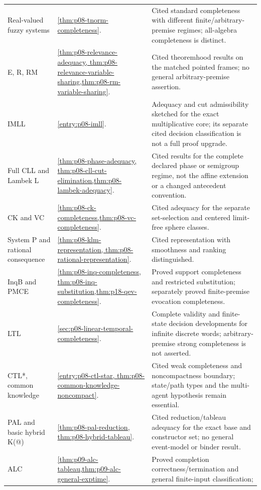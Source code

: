 \begin{longtable}{@{}p{}p{}p{}@{}}
Real-valued fuzzy systems & \cref{thm:p08-tnorm-completeness}. & Cited
standard completeness with different finite/arbitrary-premise regimes;
all-algebra completeness is distinct.\\\addlinespace
E, R, RM & \cref{thm:p08-relevance-adequacy,
thm:p08-relevance-variable-sharing,thm:p08-rm-variable-sharing}. & Cited
theoremhood results on the matched pointed frames; no general
arbitrary-premise assertion.\\\addlinespace
IMLL & \cref{entry:p08-imll}. & Adequacy and cut admissibility
sketched for the exact multiplicative core; its separate cited decision
classification is not a full proof upgrade.\\\addlinespace
Full CLL and Lambek L & \cref{thm:p08-phase-adequacy,
thm:p08-cll-cut-elimination,thm:p08-lambek-adequacy}. & Cited results for
the complete declared phase or semigroup regime, not the affine extension
or a changed antecedent convention.\\\addlinespace
CK and VC & \cref{thm:p08-ck-completeness,thm:p08-vc-completeness}. &
Cited adequacy for the separate set-selection and centered limit-free
sphere classes.\\\addlinespace
System P and rational consequence & \cref{thm:p08-klm-representation,
thm:p08-rational-representation}. & Cited representation with smoothness
and ranking distinguished.\\\addlinespace
InqB and PMCE & \cref{thm:p08-inq-completeness,
thm:p08-inq-substitution,thm:p18-qev-completeness}. & Proved support
completeness and restricted substitution; separately proved finite-premise
evocation completeness.\\\addlinespace
LTL & \cref{sec:p08-linear-temporal-completeness}. & Complete validity
and finite-state decision developments for infinite discrete words;
arbitrary-premise strong completeness is not asserted.\\\addlinespace
CTL*, common knowledge & \cref{entry:p08-ctl-star,
thm:p08-common-knowledge-noncompact}. & Cited weak completeness and
noncompactness boundary; state/path types and the multi-agent hypothesis
remain essential.\\\addlinespace
PAL and basic hybrid K(@) & \cref{thm:p08-pal-reduction,
thm:p08-hybrid-tableau}. & Cited reduction/tableau adequacy for the
exact base and constructor set; no general event-model or binder result.\\\addlinespace
ALC & \cref{thm:p09-alc-tableau,thm:p09-alc-general-exptime}. & Proved
completion correctness/termination and general finite-input classification;

\end{longtable}
